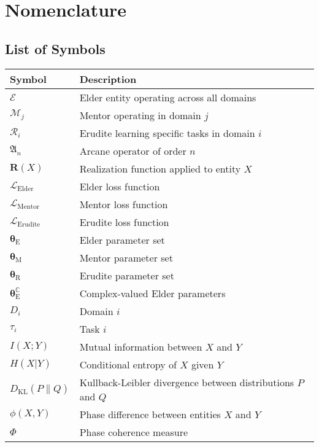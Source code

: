 \chapter{Nomenclature}

\section*{List of Symbols}

\begin{tabular}{p{3cm}p{12cm}}
\textbf{Symbol} & \textbf{Description} \\
\hline
$\mathcal{E}$ & Elder entity operating across all domains \\
$\mathcal{M}_j$ & Mentor operating in domain $j$ \\
$\mathcal{R}_i$ & Erudite learning specific tasks in domain $i$ \\
$\mathfrak{A}_n$ & Arcane operator of order $n$ \\
$\mathbf{R}(X)$ & Realization function applied to entity $X$ \\
$\mathcal{L}_{\textrm{Elder}}$ & Elder loss function \\
$\mathcal{L}_{\textrm{Mentor}}$ & Mentor loss function \\
$\mathcal{L}_{\textrm{Erudite}}$ & Erudite loss function \\
$\boldsymbol{\theta}_{\textrm{E}}$ & Elder parameter set \\
$\boldsymbol{\theta}_{\textrm{M}}$ & Mentor parameter set \\
$\boldsymbol{\theta}_{\textrm{R}}$ & Erudite parameter set \\
$\boldsymbol{\theta}_{\textrm{E}}^{\mathbb{C}}$ & Complex-valued Elder parameters \\
$D_i$ & Domain $i$ \\
$\tau_i$ & Task $i$ \\
$I(X;Y)$ & Mutual information between $X$ and $Y$ \\
$H(X|Y)$ & Conditional entropy of $X$ given $Y$ \\
$D_{\textrm{KL}}(P\|Q)$ & Kullback-Leibler divergence between distributions $P$ and $Q$ \\
$\phi(X,Y)$ & Phase difference between entities $X$ and $Y$ \\
$\Phi$ & Phase coherence measure \\
\end{tabular}